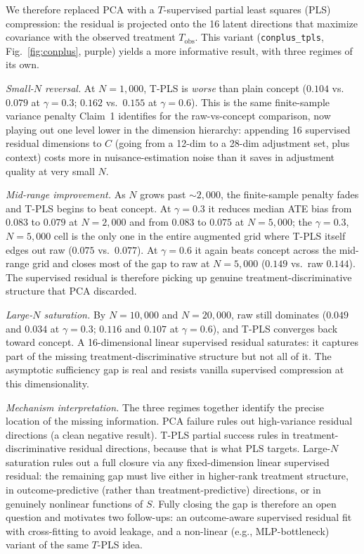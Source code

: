 \documentclass[11pt]{article}
\begin{document}
We therefore replaced PCA with a $T$-supervised partial least squares (PLS)
compression: the residual is projected onto the 16 latent directions that
maximize covariance with the observed treatment $T_{\text{obs}}$. This variant
(\texttt{conplus\_tpls}, Fig.~\ref{fig:conplus}, purple) yields a more
informative result, with three regimes of its own.

\textit{Small-$N$ reversal.} At $N{=}1{,}000$, T-PLS is \emph{worse} than
plain concept ($0.104$ vs.\ $0.079$ at $\gamma{=}0.3$; $0.162$ vs.\ $0.155$ at
$\gamma{=}0.6$). This is the same finite-sample variance penalty Claim~1
identifies for the raw-vs-concept comparison, now playing out one level lower
in the dimension hierarchy: appending 16 supervised residual dimensions to
$C$ (going from a 12-dim to a 28-dim adjustment set, plus context) costs
more in nuisance-estimation noise than it saves in adjustment quality at very
small $N$.

\textit{Mid-range improvement.} As $N$ grows past $\sim\!2{,}000$, the
finite-sample penalty fades and T-PLS begins to beat concept. At
$\gamma{=}0.3$ it reduces median ATE bias from $0.083$ to $0.079$ at
$N{=}2{,}000$ and from $0.083$ to $0.075$ at $N{=}5{,}000$; the
$\gamma{=}0.3$, $N{=}5{,}000$ cell is the only one in the entire augmented
grid where T-PLS itself edges out raw ($0.075$ vs.\ $0.077$). At
$\gamma{=}0.6$ it again beats concept across the mid-range grid and closes
most of the gap to raw at $N{=}5{,}000$ ($0.149$ vs.\ raw $0.144$). The
supervised residual is therefore picking up genuine treatment-discriminative
structure that PCA discarded.

\textit{Large-$N$ saturation.} By $N{=}10{,}000$ and $N{=}20{,}000$, raw still
dominates ($0.049$ and $0.034$ at $\gamma{=}0.3$; $0.116$ and $0.107$ at
$\gamma{=}0.6$), and T-PLS converges back toward concept. A 16-dimensional
linear supervised residual saturates: it captures part of the missing
treatment-discriminative structure but not all of it. The asymptotic
sufficiency gap is real and resists vanilla supervised compression at this
dimensionality.

\textit{Mechanism interpretation.} The three regimes together identify the
precise location of the missing information. PCA failure rules out
high-variance residual directions (a clean negative result). T-PLS partial
success rules in treatment-discriminative residual directions, because that
is what PLS targets. Large-$N$ saturation rules out a full closure via any
fixed-dimension linear supervised residual: the remaining gap must live
either in higher-rank treatment structure, in outcome-predictive (rather than
treatment-predictive) directions, or in genuinely nonlinear functions of $S$.
Fully closing the gap is therefore an open question and motivates two
follow-ups: an outcome-aware supervised residual fit with cross-fitting to
avoid leakage, and a non-linear (e.g., MLP-bottleneck) variant of the same
$T$-PLS idea.
\end{document}

